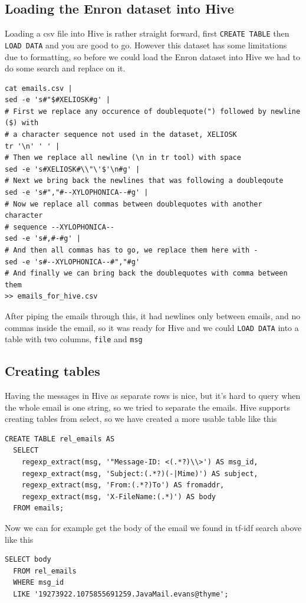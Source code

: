 \documentclass[runningheads,a4paper]{llncs}
\begin{document}
\subsection{Loading the Enron dataset into Hive}
Loading a csv file into Hive is rather straight forward, first \verb!CREATE TABLE! then \verb!LOAD DATA! and you are good to go. However this dataset has some limitations due to formatting, so before we could load the Enron dataset into Hive we had to do some search and replace on it.
\begin{verbatim}
cat emails.csv |
sed -e 's#"$#XELIOSK#g' |               
# First we replace any occurence of doublequote(") followed by newline ($) with
# a character sequence not used in the dataset, XELIOSK
tr '\n' ' ' |                           
# Then we replace all newline (\n in tr tool) with space
sed -e 's#XELIOSK#\\"\'$'\n#g' |        
# Next we bring back the newlines that was following a doubleqoute
sed -e 's#","#--XYLOPHONICA--#g' |      
# Now we replace all commas between doublequotes with another character
# sequence --XYLOPHONICA--
sed -e 's#,#-#g' |                      
# And then all commas has to go, we replace them here with -
sed -e 's#--XYLOPHONICA--#","#g'        
# And finally we can bring back the doublequotes with comma between them
>> emails_for_hive.csv
\end{verbatim}
After piping the emails through this, it had newlines only between emails, and no commas inside the email, so it was ready for Hive and we could \verb!LOAD DATA! into a table with two columns, \verb!file! and \verb!msg!
\subsection{Creating tables}
Having the messages in Hive as separate rows is nice, but it's hard to query when the whole email is one string, so we tried to separate the emails.
\newline
Hive supports creating tables from select, so we have created a more usable table like this 
\begin{verbatim}
CREATE TABLE rel_emails AS 
  SELECT 
    regexp_extract(msg, '"Message-ID: <(.*?)\\>') AS msg_id, 
    regexp_extract(msg, 'Subject:(.*?)(-|Mime)') AS subject, 
    regexp_extract(msg, 'From:(.*?)To') AS fromaddr, 
    regexp_extract(msg, 'X-FileName:(.*)') AS body 
  FROM emails;
\end{verbatim}
Now we can for example get the body of the email we found in tf-idf search above like this
\begin{verbatim}
SELECT body 
  FROM rel_emails 
  WHERE msg_id 
  LIKE '19273922.1075855691259.JavaMail.evans@thyme';
\end{verbatim}
\end{document}
